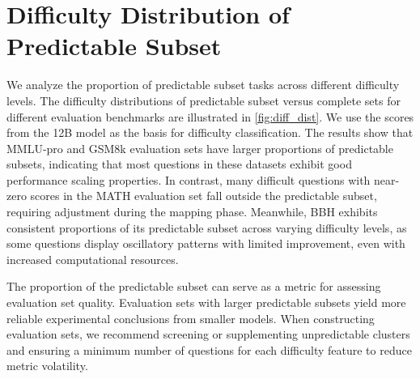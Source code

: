 \section{Difficulty Distribution of Predictable Subset}
\label{sec:difficulty_distribution}

We analyze the proportion of predictable subset tasks across different difficulty levels. 
The difficulty distributions of predictable subset versus complete sets for different evaluation benchmarks are illustrated in \cref{fig:diff_dist}. 
We use the scores from the 12B model as the basis for difficulty classification. 
The results show that MMLU-pro and GSM8k evaluation sets have larger proportions of predictable subsets, indicating that most questions in these datasets exhibit good performance scaling properties. In contrast, many difficult questions with near-zero scores in the MATH evaluation set fall outside the predictable subset, requiring adjustment during the mapping phase. 
Meanwhile, BBH exhibits consistent proportions of its predictable subset across varying difficulty levels, as some questions display oscillatory patterns with limited improvement, even with increased computational resources.


The proportion of the predictable subset can serve as a metric for assessing evaluation set quality. Evaluation sets with larger predictable subsets yield more reliable experimental conclusions from smaller models. When constructing evaluation sets, we recommend screening or supplementing unpredictable clusters and ensuring a minimum number of questions for each difficulty feature to reduce metric volatility.

